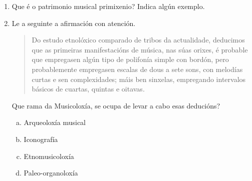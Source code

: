 

\begin{ejercicio}
 \begin{enumerate}[1)]
  \item 
  Que é o patrimonio musical primixenio? 
  Indica algún exemplo. \par
  \vspace*{3.50cm}
 
 \item
 Le a seguinte a afirmación con atención.
 \begin{quote}
 \small{
 Do estudo etnolóxico comparado de tribos da actualidade, deducimos que as primeiras manifestacións de música, nas súas orixes, é probable que empregasen algún tipo de polifonía simple con bordón, pero probablemente empregasen escalas de dous a sete sons, con melodías curtas e sen complexidades; máis ben sinxelas, empregando intervalos básicos de cuartas, quintas e oitavas.
 }
 \end{quote}
Que rama da Musicoloxía, se ocupa de levar a cabo esas deducións?
\begin{enumerate}[a)]
 \item 
 Arqueoloxía musical
 \item
 Iconografía
 \item
 Etnomusicoloxía %
 \item
 Paleo-organoloxía
\end{enumerate}

 \end{enumerate}
\end{ejercicio}
%
